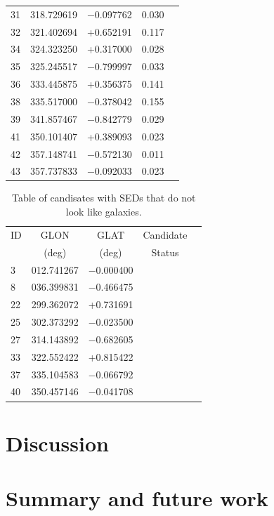 \documentclass[times,usenatbib]{mn2e}
\begin{document}
\begin{table}
\begin{center}
\begin{tabular}{lcccc}
31 & 318.729619 & $-$0.097762 & 0.030 & \\
32 & 321.402694 &   +0.652191 & 0.117 & \\
34 & 324.323250 &   +0.317000 & 0.028 & \\
35 & 325.245517 & $-$0.799997 & 0.033 & \\
36 & 333.445875 &   +0.356375 & 0.141 & \\
38 & 335.517000 & $-$0.378042 & 0.155 & \\
39 & 341.857467 & $-$0.842779 & 0.029 & \\
41 & 350.101407 &   +0.389093 & 0.023 & \\
42 & 357.148741 & $-$0.572130 & 0.011 & \\
43 & 357.737833 & $-$0.092033 & 0.023 & \\
\hline
\end{tabular}
\end{center}
\label{galaxy-catalogue}
\end{table}

\begin{table}
\begin{center}
\caption{Table of candisates with SEDs that do not look like galaxies.}
\begin{tabular}{lcccc}
\hline
ID & GLON & GLAT & Candidate \\
 & (deg) & (deg) & Status \\
\hline
 3 & 012.741267 & $-$0.000400 &  \\
 8 & 036.399831 & $-$0.466475 &  \\
22 & 299.362072 &   +0.731691 &  \\
25 & 302.373292 & $-$0.023500 &  \\
27 & 314.143892 & $-$0.682605 &  \\
33 & 322.552422 &   +0.815422 &  \\
37 & 335.104583 & $-$0.066792 &  \\
40 & 350.457146 & $-$0.041708 &  \\
\hline
\end{tabular}
\end{center}
\label{other-catalogue}
\end{table}

\section{Discussion}

\section{Summary and future work}
\end{document}
